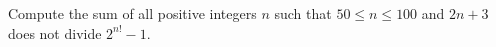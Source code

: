 Compute the sum of all positive integers $n$ such that $50 \leq n \leq 100$ and $2 n+3$ does not divide $2^{n!}-1$.